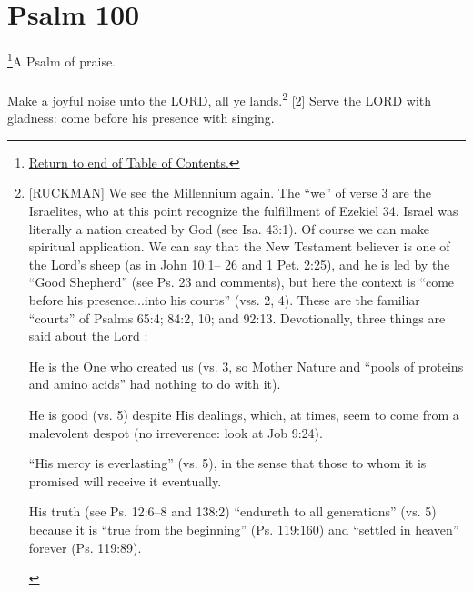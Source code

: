 \chapter{Psalm 100}
\footnote{\textcolor[rgb]{0.00,0.25,0.00}{\hyperlink{TOC}{Return to end of Table of Contents.}}}\textcolor[rgb]{0.00,0.00,1.00}{A Psalm of praise.}\\
\\
\textcolor[rgb]{0.00,0.00,1.00}{Make a joyful noise unto the LORD, all ye lands.}\footnote{[RUCKMAN] We see the Millennium again. The “we” of
verse 3 are the Israelites, who at this point
recognize the fulfillment of Ezekiel 34. Israel
was literally a nation created by God (see Isa.
43:1).
Of course we can make spiritual application.
We can say that the New Testament believer
is one of the Lord’s sheep (as in John 10:1–
26 and 1 Pet. 2:25), and he is led by the
“Good Shepherd” (see Ps. 23 and
comments), but here the context is “come
before his presence...into his courts” (vss.
2, 4). These are the familiar “courts” of
Psalms 65:4; 84:2, 10; and 92:13.
Devotionally, three things are said about the
Lord  \cite{Ruckman1992Psalms} :
\begin{compactenum}
\item He is the One who created us (vs. 3, so
Mother Nature and “pools of proteins and
amino acids” had nothing to do with it).
\item He is good (vs. 5) despite His dealings,
which, at times, seem to come from a
malevolent despot (no irreverence: look at Job
9:24).
\item “His mercy is everlasting” (vs. 5), in the
sense that those to whom it is promised will
receive it eventually.
\item His truth (see Ps. 12:6–8 and 138:2)
“endureth to all generations” (vs. 5)
because it is “true from the beginning” (Ps.
119:160) and “settled in heaven” forever
(Ps. 119:89).
\end{compactenum}}
[2] \textcolor[rgb]{0.00,0.00,1.00}{Serve the LORD with gladness: come before his presence with singing.}
